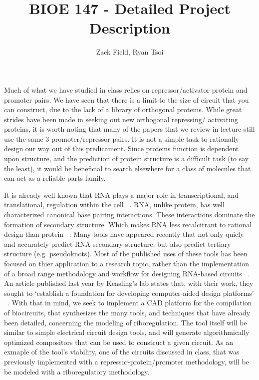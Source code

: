 \documentclass[11pt]{article}
\title{BIOE 147 - Detailed Project Description}
\author{Zack Field, Ryan Tsoi}
\date{}
\begin{document}
\maketitle

 
 Much of what we have studied in class relies on repressor/activator protein
 and promoter pairs. We have seen that there is a limit to the size of circuit 
 that you can construct, due to the lack of a library of orthogonal proteins.
 While great strides have been made in seeking out new orthogonal repressing/
 activating proteins, it is worth noting that many of the papers that we
 review in lecture still use the same 3 promoter/repressor pairs. 
 It is not a simple task to rationally design our way out of this predicament.
 Since proteins function is dependent upon structure, and the prediction of 
 protein structure is a difficult task (to say the least),
 it would be beneficial to search elsewhere 
 for a class of molecules that can act as a reliable parts family. 

 It is already well known that RNA 
 plays a major role in transcriptional, and translational, regulation within 
 the cell  ~\cite{review}. RNA, unlike protein, has well characterized canonical base pairing 
 interactions.  These interactions dominate the formation of secondary structure. 
 Which makes RNA less recalcitrant to rational design than protein ~\cite{howfolds}. Many tools
 have appeared recently that not only quicly and accurately predict RNA secondary structure,
 but also predict tertiary structure (e.g. pseudoknots). Most of the published uses of
 these tools has been focused on thier application to a research topic, rather than
 the implementation of a broad range methodology and workflow for designing 
 RNA-based circuits ~\cite{genetic_switchboard}. An article published last year
 by Keasling's lab states that, with their work, they sought to `establish a foundation for 
 developing computer-aided design platforms' ~\cite{Keasling_Model-Driven}.
 With that in mind, we seek to implement a CAD platform for the compilation of
 biocircuits, that synthesizes the many tools, and techniques that have already
 been detailed, concerning the modeling of riboregulation. The tool itself will
 be similar to simple electrical circuit design tools, and will generate
 algorithmically optimized compositors that can be used to construct a given circuit.
 As an exmaple of the tool's viability, one of the circuits discussed in class, that
 was previously implemented with a repressor-protein/promoter methodology, will be 
 be modeled with a riboregulatory methodology.
\end{document}
